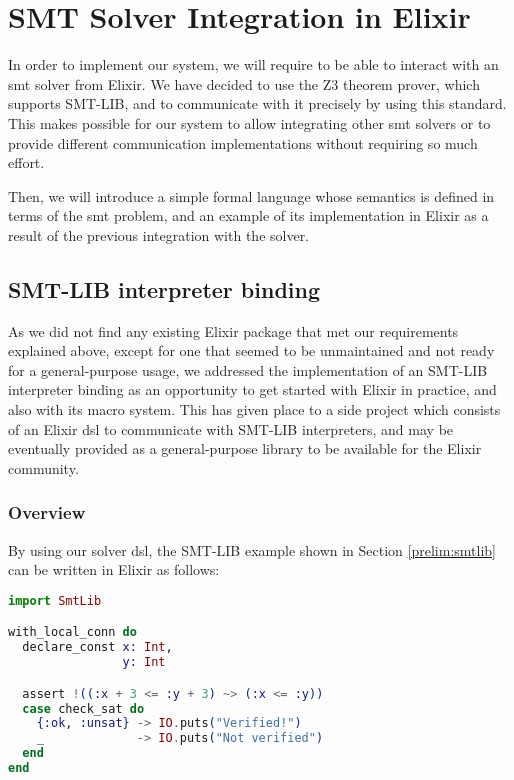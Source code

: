 \chapter{SMT Solver Integration in Elixir}
\label{cap:smtSolverIntegration}

In order to implement our system, we will require to be able to interact with an
\acrshort{smt} solver from Elixir. We have decided to use the Z3 theorem prover,
which supports SMT-LIB, and to communicate with it precisely by using this
standard. This makes possible for our system to allow integrating other
\acrshort{smt} solvers or to provide different communication implementations
without requiring so much effort.

Then, we will introduce a simple formal language whose semantics is defined in
terms of the \gls{smt} problem, and an example of its implementation in Elixir
as a result of the previous integration with the solver.

\section{SMT-LIB interpreter binding}

As we did not find any existing Elixir package that met our requirements
explained above, except for one that seemed to be unmaintained and not ready for
a general-purpose usage, we addressed the implementation of an SMT-LIB
interpreter binding as an opportunity to get started with Elixir in practice,
and also with its macro system. This has given place to a side project which
consists of an Elixir \gls{dsl} to communicate with SMT-LIB interpreters, and
may be eventually provided as a general-purpose library to be available for the
Elixir community.

\subsection{Overview}
\label{integ:dslexample}

By using our solver \gls{dsl}, the SMT-LIB example shown in Section
\ref{prelim:smtlib} can be written in Elixir as follows:

\begin{lstlisting}[language=elixir,numbers=none,frame=none]
import SmtLib

with_local_conn do
  declare_const x: Int,
                y: Int

  assert !((:x + 3 <= :y + 3) ~> (:x <= :y))
  case check_sat do 
    {:ok, :unsat} -> IO.puts("Verified!")
    _             -> IO.puts("Not verified")
  end
end
\end{lstlisting}

